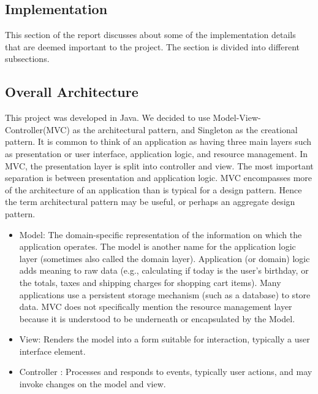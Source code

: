 \documentclass[11pt]{article}
\begin{document}
{\begin{itemize}
	
\section{Implementation} 

This section of the report discusses about some of the implementation details that are deemed important to the project. The section is divided into different subsections.
\subsection{Overall Architecture}
This project was developed in Java. We decided to use Model-View-Controller(MVC) as the architectural pattern, and Singleton as the creational pattern. It is common to think of an application as having three main
layers such as presentation or user interface, application logic, and resource management. In MVC, the presentation
layer is split into controller and view. The most important separation is between presentation and
application logic. MVC encompasses more of the architecture of an application than is typical for a design pattern. Hence the term architectural pattern may be useful, or perhaps an aggregate design pattern.
    \begin{itemize}
    \item Model: The domain-specific representation of the information on which the application operates.
    The model is another name for the application logic layer (sometimes also called the
    domain layer). Application (or domain) logic adds meaning to raw data (e.g., calculating if today
    is the user’s birthday, or the totals, taxes and shipping charges for shopping cart items).
    Many applications use a persistent storage mechanism (such as a database) to store data.
    MVC does not specifically mention the resource management layer because it is understood
    to be underneath or encapsulated by the Model.
    \item View: Renders the model into a form suitable for interaction, typically a user interface
    element.
    \item Controller : Processes and responds to events, typically user actions, and may invoke changes
    on the model and view.
    \end{itemize}


\end{itemize}}
\end{document}
